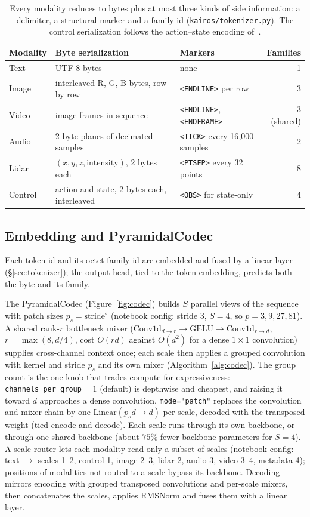 \documentclass[11pt]{article}
\begin{document}
\begin{table}[t]
\centering
\small
\begin{tabular}{p{1.7cm}p{6.2cm}p{4.3cm}r}
\toprule
Modality & Byte serialization & Markers & Families \\
\midrule
Text & UTF-8 bytes & none & 1 \\
Image & interleaved R, G, B bytes, row by row & \texttt{<ENDLINE>} per row & 3 \\
Video & image frames in sequence & \texttt{<ENDLINE>}, \texttt{<ENDFRAME>} & 3 (shared) \\
Audio & 2-byte planes of decimated samples & \texttt{<TICK>} every 16{,}000 samples & 2 \\
Lidar & $(x,y,z,\text{intensity})$, 2 bytes each & \texttt{<PTSEP>} every 32 points & 8 \\
Control & action and state, 2 bytes each, interleaved & \texttt{<OBS>} for state-only & 4 \\
\bottomrule
\end{tabular}
\caption{Every modality reduces to bytes plus at most three kinds of side information: a
delimiter, a structural marker and a family id (\texttt{kairos/tokenizer.py}). The control
serialization follows the action--state encoding of~\citet{furfaro2024pixelbytes}.}
\label{tab:tokenizer}
\end{table}

\subsection{Embedding and PyramidalCodec}

Each token id and its octet-family id are embedded and fused by a linear layer (\S\ref{sec:tokenizer});
the output head, tied to the token embedding, predicts both the byte and its family.

The PyramidalCodec (Figure~\ref{fig:codec}) builds $S$ parallel views of the sequence with patch sizes
$p_s=\text{stride}^s$ (notebook config: stride $3$, $S=4$, so $p=3,9,27,81$). A shared
rank-$r$ bottleneck mixer
($\text{Conv1d}_{d\to r}\to\text{GELU}\to\text{Conv1d}_{r\to d}$,
$r=\max(8,d/4)$, cost $O(rd)$ against $O(d^2)$ for a dense $1{\times}1$
convolution) supplies cross-channel context once; each scale then applies a
grouped convolution with kernel and stride $p_s$ and its own mixer
(Algorithm~\ref{alg:codec}). The group count is the one knob that trades
compute for expressiveness: \texttt{channels\_per\_group}$=1$ (default) is
depthwise and cheapest, and raising it toward $d$ approaches a dense
convolution. \texttt{mode="patch"} replaces the convolution and mixer chain by
one $\text{Linear}(p_s d\to d)$ per scale, decoded with the transposed weight
(tied encode and decode). Each scale runs through its own backbone, or through
one shared backbone (about $75\%$ fewer backbone parameters for $S=4$). A
scale router lets each modality read only a subset of scales (notebook config: text
$\to$ scales 1--2, control 1, image 2--3, lidar 2, audio 3, video 3--4,
metadata 4); positions of modalities not routed to a scale bypass its
backbone. Decoding mirrors encoding with grouped transposed convolutions and
per-scale mixers, then concatenates the scales, applies RMSNorm and fuses them
with a linear layer.
\end{document}
